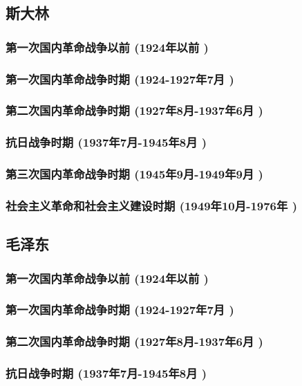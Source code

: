 \documentclass[UTF8]{../RepresentationUniverse}
\begin{document}
\subsection{斯大林}
    \subsubsection{第一次国内革命战争以前 (1924年以前 )}
    \subsubsection{第一次国内革命战争时期 (1924-1927年7月 )}
    \subsubsection{第二次国内革命战争时期 (1927年8月-1937年6月 )}
    \subsubsection{抗日战争时期 (1937年7月-1945年8月 )}
    \subsubsection{第三次国内革命战争时期 (1945年9月-1949年9月 )}
    \subsubsection{社会主义革命和社会主义建设时期 (1949年10月-1976年 )}



\subsection{毛泽东}
    \subsubsection{第一次国内革命战争以前 (1924年以前 )}
    \subsubsection{第一次国内革命战争时期 (1924-1927年7月 )}
    \subsubsection{第二次国内革命战争时期 (1927年8月-1937年6月 )}
    \subsubsection{抗日战争时期 (1937年7月-1945年8月 )}
\end{document}
